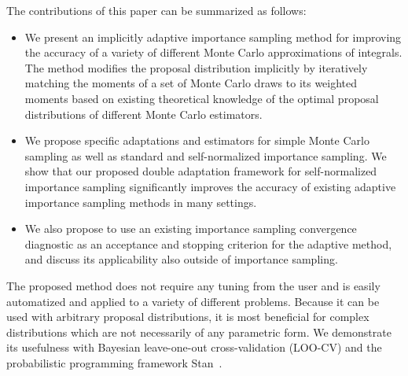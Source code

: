 \documentclass[12pt]{article}
\begin{document}
%
%
%



The contributions of this paper can be summarized as follows:
\begin{itemize}
\item We present an implicitly adaptive importance sampling method
for improving the accuracy of a variety of different Monte Carlo approximations of integrals.
The method modifies the proposal distribution implicitly by
iteratively matching the moments of a set of Monte Carlo draws to its weighted moments
based on existing theoretical knowledge of the optimal proposal distributions of different
Monte Carlo estimators.
\item We propose specific adaptations and estimators for
simple Monte Carlo sampling as well as standard and self-normalized importance sampling.
We show that our proposed double adaptation framework for self-normalized importance sampling significantly
improves the accuracy of existing adaptive importance sampling methods in many settings.
\item We also propose to use an existing importance sampling convergence diagnostic
as an acceptance and stopping criterion for the adaptive method, and discuss its applicability
also outside of importance sampling.
\end{itemize}
%
%
%
%



The proposed method does not require any tuning from the user and is easily automatized and applied
to a variety of different problems.
Because it can be used with arbitrary proposal distributions, it is
most beneficial for complex distributions which are not necessarily of any parametric form.
We demonstrate its usefulness with
Bayesian leave-one-out cross-validation (LOO-CV) and the probabilistic programming framework Stan~\citep{carpenter2017stan}.
\end{document}
